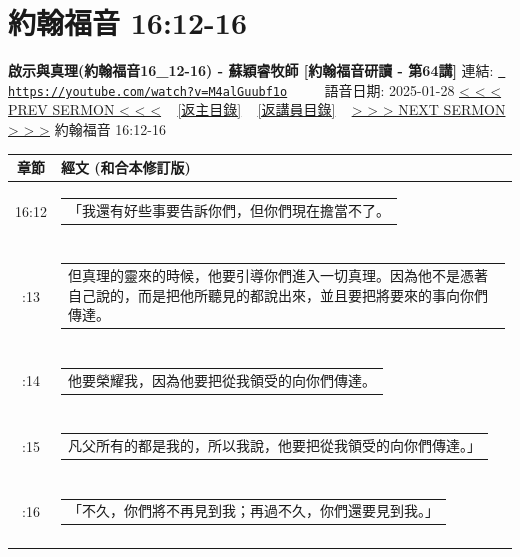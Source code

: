 \documentclass{book}
\begin{document}
\section{約翰福音 16:12-16}
\label{sec:M4alGuubf1o}
\textbf{啟示與真理(約翰福音16\_12-16) - 蘇穎睿牧師 [約翰福音研讀 - 第64講]}
\newline
\newline
連結: \href{https://youtube.com/watch?v=M4alGuubf1o}{\texttt{ https://youtube.com/watch?v=M4alGuubf1o}} ~~~~ 語音日期: 2025-01-28 
\newline
\newline
\hyperref[sec:pF1FrHKEPww]{< < < PREV SERMON < < <}
~
\hyperlink{toc}{[返主目錄]}
~
\hyperref[ch:preacher5]{[返講員目錄]}
~
\hyperref[sec:HaGDtN4u47U]{> > > NEXT SERMON > > >}
\newline
\newline
約翰福音 16:12-16
\newline
\begin{longtable}{cl}
\hline
\hline
章節 & 經文 (和合本修訂版)\\
\hline
16:12 & \begin{tabularx}{0.7\textwidth}{X} 「我還有好些事要告訴你們，但你們現在擔當不了。 \end{tabularx} \\ \\ \relax
16:13 & \begin{tabularx}{0.7\textwidth}{X} 但真理的靈來的時候，他要引導你們進入一切真理。因為他不是憑著自己說的，而是把他所聽見的都說出來，並且要把將要來的事向你們傳達。 \end{tabularx} \\ \\ \relax
16:14 & \begin{tabularx}{0.7\textwidth}{X} 他要榮耀我，因為他要把從我領受的向你們傳達。 \end{tabularx} \\ \\ \relax
16:15 & \begin{tabularx}{0.7\textwidth}{X} 凡父所有的都是我的，所以我說，他要把從我領受的向你們傳達。」 \end{tabularx} \\ \\ \relax
16:16 & \begin{tabularx}{0.7\textwidth}{X} 「不久，你們將不再見到我；再過不久，你們還要見到我。」 \end{tabularx} \\ \\
[1ex]
\hline
\hline
\end{longtable}
\end{document}
